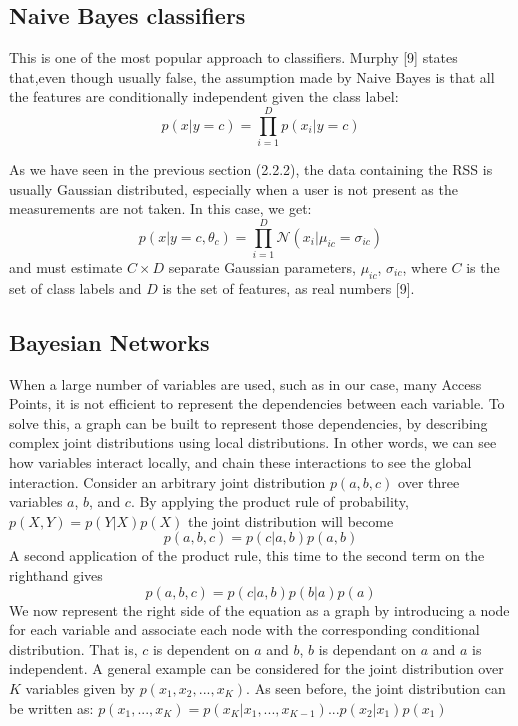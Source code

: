 \subsection{Naive Bayes classifiers}
This is one of the most popular approach to classifiers. Murphy [9] states that,even though usually false, the assumption made by Naive Bayes is that all the features are conditionally independent given the class label:
$$ p(x|y = c) = \prod\limits_{i=1}^D p(x_i|y = c) $$

As we have seen in the previous section (2.2.2), the data containing the RSS is usually Gaussian distributed, especially when a user is not present as the measurements are not taken. In this case, we get:
$$ p(x|y = c,\theta_c) = \prod\limits_{i=1}^D \mathcal{N}(x_i|\mu_{ic} = \sigma_{ic}) $$ and must estimate $C \times D$ separate Gaussian parameters, $\mu_{ic}$, $\sigma_{ic}$, where $C$ is the set of class labels and $D$ is the set of features, as real numbers [9].

\subsection{Bayesian Networks}
When a large number of variables are used, such as in our case, many Access Points, it is not efficient to represent the dependencies between each variable. To solve this, a graph can be built to represent those dependencies, by describing complex joint distributions using local distributions. In other words, we can see how variables interact locally, and chain these interactions to see the global interaction.
Consider an arbitrary joint distribution $p(a,b,c)$ over three variables $a$, $b$, and $c$.
By applying the product rule of probability, $p(X,Y) = p(Y|X)p(X)$ the joint distribution will become $$p(a,b,c) = p(c|a,b)p(a,b)$$
A second application of the product rule, this time to the second term on the righthand gives $$p(a,b,c) = p(c|a, b)p(b|a)p(a)$$
We now represent the right side of the equation as a graph by introducing a node for each variable and associate each node with the corresponding conditional distribution. That is, $c$ is dependent on $a$ and $b$, $b$ is dependant on $a$ and $a$ is independent. A general example can be considered for the joint distribution over $K$ variables given by $p(x_1,x_2,...,x_K)$. As seen before, the joint distribution can be written as: $p(x_1,...,x_K) = p(x_K|x_1,...,x_{K-1})...p(x_2|x_1)p(x_1)$


